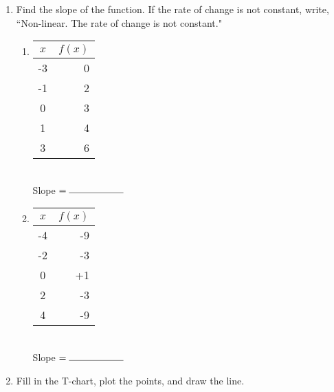 \documentclass[12pt, oneside]{article}
\begin{document}
\begin{enumerate}
  \item Find the slope of the function. If the rate of change is not constant, write, ``Non-linear. The rate of change is not constant."

    \begin{multicols}{2}
    \begin{enumerate}
      \item
        \begin{tabular}{|c|r|}
          \hline
          $x$ & $f(x)$\\
          \hline
          -3 & 0 \\
          \hline
          -1 & 2 \\
          \hline
          0 & 3 \\
          \hline
          1 & 4 \\
          \hline
          3 & 6 \\
          \hline
        \end{tabular}\\[0.85cm]

        Slope $= \rule{2cm}{0.15mm}$\\


      \item
        \begin{tabular}{|c|r|}
          \hline
          $x$ & $f(x)$\\
          \hline
          -4 & -9 \\
          \hline
          -2 & -3 \\
          \hline
          0 & +1 \\
          \hline
          2 & -3 \\
          \hline
          4 & -9 \\
          \hline
        \end{tabular}\\[0.85cm]

        Slope $= \rule{2cm}{0.15mm}$\\

      \end{enumerate}
    \end{multicols}

\newpage


\item Fill in the T-chart, plot the points, and draw the line.


\end{enumerate}
\end{document}
